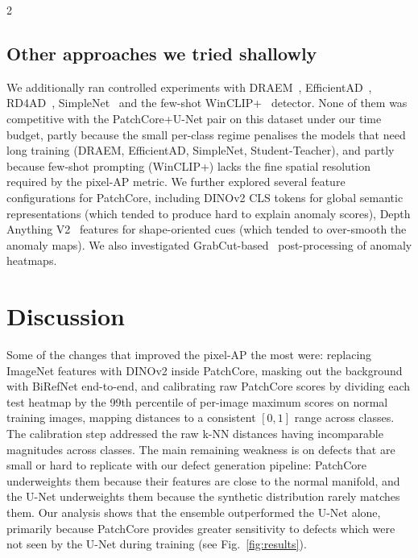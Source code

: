 \documentclass[11pt]{article}
\begin{document}
\begin{multicols}{2}
        \subsection{Other approaches we tried shallowly}
        We additionally ran controlled experiments with
        DRAEM~\cite{zavrtanik2021draem},
        EfficientAD~\cite{batzner2024efficientad},
        RD4AD~\cite{deng2022rd4ad},
        SimpleNet~\cite{liu2023simplenet} and the few-shot
        WinCLIP+~\cite{jeong2023winclip} detector. None of them was
        competitive with the PatchCore+U-Net pair on this dataset under our
        time budget, partly because the small per-class regime penalises
        the models that need long training (DRAEM, EfficientAD, SimpleNet, Student-Teacher),
        and partly because few-shot prompting (WinCLIP+) lacks the fine
        spatial resolution required by the pixel-AP metric. 
        We further explored several feature configurations for PatchCore, including DINOv2 CLS tokens for global semantic representations (which tended to produce hard to explain anomaly scores), Depth Anything V2~\cite{yang2024depthv2} features for shape-oriented cues (which tended to over-smooth the anomaly maps). We also investigated GrabCut-based~\cite{rother2004grabcut} post-processing of anomaly heatmaps.
        
        \section{Discussion}
        Some of the changes that improved the pixel-AP the most were:
         replacing ImageNet features with DINOv2 inside
        PatchCore,  masking out the background with
        BiRefNet end-to-end, and calibrating raw PatchCore scores by dividing each test heatmap by the 99th percentile of per-image maximum scores on normal training images, mapping distances to a consistent $[0,1]$ range across classes. The calibration step addressed the raw k-NN distances having incomparable magnitudes across classes. The main remaining weakness is on
        defects that are small or hard to replicate with our defect generation pipeline: PatchCore underweights
        them because their features are close to the normal manifold, and
        the U-Net underweights them because the synthetic distribution
        rarely matches them.
        Our analysis shows that the ensemble outperformed the U-Net alone, primarily because PatchCore provides greater sensitivity to defects which were not seen by the U-Net during training (see Fig.~\ref{fig:results}).

\end{multicols}
\end{document}
